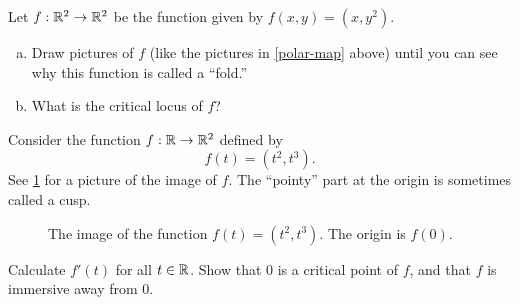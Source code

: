 \begin{exercise}[Fold] \label{fold}
	Let $f : \mathbb{R}^2 \to \mathbb{R}^2$ be the function given by $f(x, y) = (x, y^2)$. 
	\begin{enumerate}[(a)]
		\item Draw pictures of $f$ (like the pictures in \cref{polar-map} above) until you can see why this function is called a ``fold.''
		\item What is the critical locus of $f$? 
	\end{enumerate}
\end{exercise}

\begin{exercise} \label{cusp}
	Consider the function $f : \mathbb{R} \to \mathbb{R}^2$ defined by
	\[ f(t) = (t^2, t^3). \]
	See \cref{cusp-graph} for a picture of the image of $f$. The ``pointy'' part at the origin is sometimes called a cusp.
	\begin{figure}
			\begin{center}
		\end{center}
	\caption{The image of the function $f(t) = (t^2, t^3)$. The origin is $f(0)$.}  \label{cusp-graph}
	\end{figure}
	Calculate $f'(t)$ for all $t \in \mathbb{R}$. Show that 0 is a critical point of $f$, and that $f$ is immersive away from 0.
\end{exercise}


